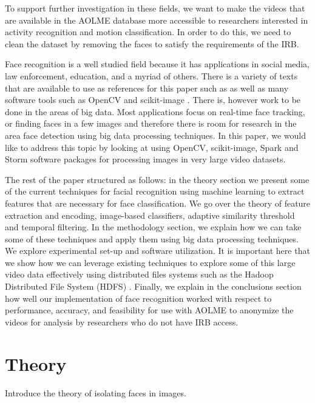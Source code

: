 \documentclass[
	submission,
	final,
	notitlepage,
	narroweqnarray,
	inline,
	twoside,
	]{ieee}
\begin{document}
To support further investigation in these fields, we want to make the videos that are available
in the AOLME database more accessible to researchers interested in 
activity recognition and motion classification. In order to do this, 
we need to clean the dataset by removing the faces to satisfy the requirements
of the IRB.

Face recognition is a well studied field because it has applications in 
social media, law enforcement, education, and a myriad of others. There is a 
variety of texts that are available to use as references for this paper such
as \cite{face_recog_book} \cite{kernel_learning} \cite{machine_face_recog} 
as well as many software tools such as OpenCV \cite{opencv} and scikit-image
\cite{scikit-image}. There is, however work to be done in the areas of
big data. Most applications focus on real-time face tracking, or finding
faces in a few images and therefore there is room for research in the area
face detection using big data processing techniques. In this paper, we
would like to address this topic by looking at using OpenCV, scikit-image, 
Spark and Storm software packages for processing images in very large
video datasets.

The rest of the paper structured as follows: in the theory section we 
present some of the current techniques for facial recognition using 
machine learning to extract features that are necessary for face 
classification. We go over the theory of feature extraction and encoding, 
image-based classifiers, adaptive similarity threshold and temporal filtering. 
In the methodology section, we explain how we can take some of these
techniques and apply them using big data processing techniques. 
We explore experimental set-up and software utilization. It is 
important here that we show how we can leverage existing techniques
to explore some of this large video data effectively using distributed
files systems such as the Hadoop Distributed File System (HDFS) \cite{hadoop}. 
Finally, we explain in the conclusions section how well our 
implementation of face recognition worked with respect to 
performance, accuracy, and feasibility for use with AOLME to
 anonymize the videos for analysis by researchers who do not have
IRB access.  

\section{Theory}
\PARstart Introduce the theory of isolating faces in images.
\end{document}
